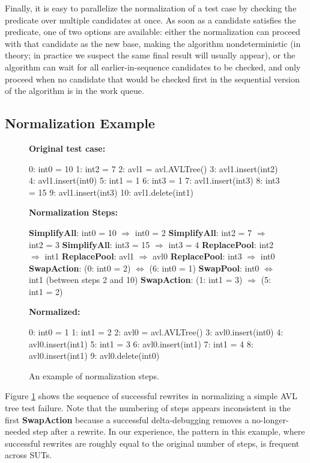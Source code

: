 Finally, it is easy to parallelize the normalization of a test case by
checking the predicate over multiple candidates at once.  As soon as a
candidate satisfies the predicate, one of two options are available:
either the normalization can proceed with that candidate as the new
base, making the algorithm nondeterministic (in theory; in
practice we suspect the same final result will usually appear), or the
algorithm can wait for all earlier-in-sequence candidates to be
checked, and only proceed when no candidate that would be checked
first in the sequential version of the algorithm is in the work
queue.

\subsection{Normalization Example}
\label{formalexample}

\begin{figure}
{\scriptsize
{\bf Original test case:}
\begin{code}
  0: int0 = 10 
  1: int2 = 7 
  2: avl1 = avl.AVLTree() 
  3: avl1.insert(int2) 
  4: avl1.insert(int0) 
  5: int1 = 1 
  6: int3 = 1 
  7: avl1.insert(int3) 
  8: int3 = 15 
  9: avl1.insert(int3) 
 10: avl1.delete(int1) 
\end{code}
{\bf Normalization Steps:}
\begin{code}
{\bf SimplifyAll}: int0 = 10 $\Rightarrow$ int0 = 2 
{\bf SimplifyAll}: int2 = 7  $\Rightarrow$ int2 = 3 
{\bf SimplifyAll}: int3 = 15  $\Rightarrow$ int3 = 4 
{\bf ReplacePool}: int2 $\Rightarrow$ int1
{\bf ReplacePool}: avl1 $\Rightarrow$ avl0
{\bf ReplacePool}: int3 $\Rightarrow$ int0
{\bf SwapAction}: (0: int0 = 2)  $\Leftrightarrow$ (6: int0 = 1)
{\bf SwapPool}: int0 $\Leftrightarrow$ int1 (between steps 2 and 10)
{\bf SwapAction}: (1: int1 = 3)  $\Rightarrow$ (5: int1 = 2)
\end{code}
{\bf Normalized:}
\begin{code}
  0: int0 = 1
  1: int1 = 2
  2: avl0 = avl.AVLTree()
  3: avl0.insert(int0) 
  4: avl0.insert(int1) 
  5: int1 = 3  
  6: avl0.insert(int1) 
  7: int1 = 4  
  8: avl0.insert(int1)  
  9: avl0.delete(int0) 
\end{code}
}
\caption{An example of normalization steps.}
\label{diffnorm}
\end{figure}

Figure \ref{diffnorm} shows the sequence of successful rewrites in
normalizing a simple AVL tree test failure.  Note that the numbering
of steps appears inconsistent in the first {\bf SwapAction} because a
successful delta-debugging removes a no-longer-needed step after a
rewrite.  In our experience, the pattern in this example, where successful rewrites
are roughly equal to the original number of steps, is frequent across SUTs.

